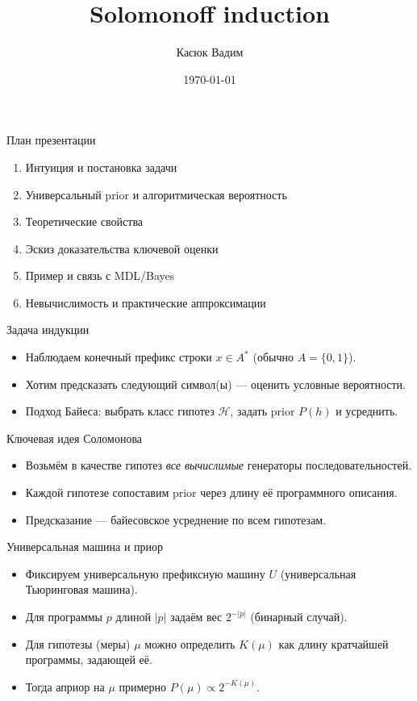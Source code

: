 \documentclass{beamer}
\title[Solomonoff induction]{Solomonoff induction}
\author{Касюк Вадим}
\date{\today}
\begin{document}
\begin{frame}
  \titlepage
\end{frame}

\begin{frame}{План презентации}
  \begin{enumerate}
    \item Интуиция и постановка задачи
    \item Универсальный prior и алгоритмическая вероятность
    \item Теоретические свойства 
    \item Эскиз доказательства ключевой оценки
    \item Пример и связь с MDL/Bayes
    \item Невычислимость и практические аппроксимации
  \end{enumerate}
\end{frame}

\begin{frame}{Задача индукции}
  \begin{itemize}
    \item Наблюдаем конечный префикс строки $x\in A^*$ (обычно $A=\{0,1\}$).
    \item Хотим предсказать следующий символ(ы) — оценить условные вероятности.
    \item Подход Байеса: выбрать класс гипотез $\mathcal H$, задать prior $P(h)$ и усреднить.
  \end{itemize}
\end{frame}

\begin{frame}{Ключевая идея Соломонова}
  \begin{itemize}
    \item Возьмём в качестве гипотез \emph{все вычислимые} генераторы последовательностей.
    \item Каждой гипотезе сопоставим prior через длину её программного описания.
    \item Предсказание — байесовское усреднение по всем гипотезам.
  \end{itemize}
\end{frame}

\begin{frame}{Универсальная машина и приор}
  \begin{itemize}
    \item Фиксируем универсальную префиксную машину $U$ (универсальная Тьюринговая машина).
    \item Для программы $p$ длиной $|p|$ задаём вес $2^{-|p|}$ (бинарный случай).
    \item Для гипотезы (меры) $\mu$ можно определить $K(\mu)$ как длину кратчайшей программы, задающей её.
    \item Тогда априор на $\mu$ примерно $P(\mu)\propto 2^{-K(\mu)}$.
  \end{itemize}
  
\end{frame}
\end{document}
